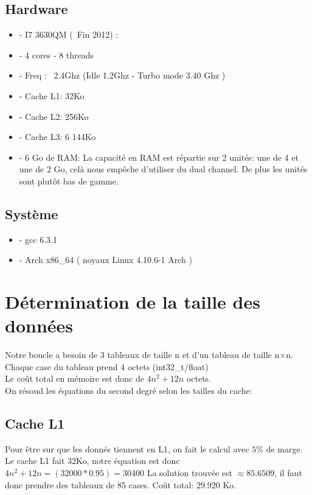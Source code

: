 \documentclass{report}
\begin{document}
\subsection*{Hardware}

\begin{itemize}
    \item{- I7 3630QM (~Fin 2012) :}
    \item{- 4 cores - 8 threads}
    \item{- Freq : ~2.4Ghz (Idle 1.2Ghz - Turbo mode 3.40 Ghz )}
    \item{- Cache L1: 32Ko}
    \item{- Cache L2: 256Ko}
    \item{- Cache L3: 6 144Ko}
    \item{- 6 Go de RAM:  La capacité en RAM est répartie sur 2 unités: une de 4 et une de 2 Go, celà nous empêche d'utiliser du dual channel. De plus les unités sont plutôt bas de gamme.}
\end{itemize}

\subsection*{Système}

\begin{itemize}
    \item{- gcc 6.3.1}
    \item{- Arch x86\_64 ( noyaux Linux 4.10.6-1 Arch )}
\end{itemize}

\section*{Détermination de la taille des données}

Notre boucle a besoin de 3 tableaux de taille n et d'un tableau de taille n$\times$n.\\
Chaque case du tableau prend 4 octets (int32\_t/float)\\
Le coût total en mémoire est donc de $4n^2+12n$ octets.\\

On résoud les équations du second degré selon les tailles du cache:\\

\subsection*{Cache L1}
Pour être sur que les donnés tiennent en L1, on fait le calcul avec $5\%$ de marge.
Le cache L1 fait 32Ko, notre équation est donc $4n^2+12n=(32 000*0.95)=30 400$
La solution trouvée est $\approx 85.6509$, il faut donc prendre des tableaux de 85 cases. Coût total: 29.920 Ko.\\
\end{document}
